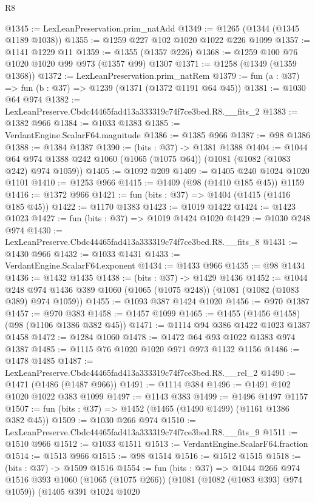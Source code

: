 \begin{lexlean}{R8}
\begin{coremodule}
@1345 := LexLeanPreservation.prim_natAdd
@1349 := @1265 (@1344 (@1345 @1189 @1038))
@1355 := @1259 @227 @102 @1020 @1022 @226 @1099
@1357 := @1141 @1229 @11
@1359 := @1355 (@1357 @226)
@1368 := @1259 @100 @76 @1020 @1020 @99 @973 (@1357 @99) @1307
@1371 := @1258 (@1349 (@1359 @1368))
@1372 := LexLeanPreservation.prim_natRem
@1379 := fun (a : @37) => fun (b : @37) => @1239 (@1371 (@1372 @1191 @64 @45))
@1381 := @1030 @64 @974
@1382 := LexLeanPreserve.Cbdc44465fad413a333319c74f7ce3bed.R8.__fits_2
@1383 := @1382 @966
@1384 := @1033 @1383
@1385 := VerdantEngine.ScalarF64.magnitude
@1386 := @1385 @966
@1387 := @98 @1386
@1388 := @1384 @1387
@1390 := (bits : @37) -> @1381 @1388
@1404 := @1044 @64 @974 @1388 @242 @1060 (@1065 (@1075 @64)) (@1081 (@1082 (@1083 @242) @974 @1059))
@1405 := @1092 @209
@1409 := @1405 @240 @1024 @1020 @1101
@1410 := @1253 @966
@1415 := @1409 (@98 (@1410 @185 @45)) @1159
@1416 := @1372 @966
@1421 := fun (bits : @37) => @1404 (@1415 (@1416 @185 @45))
@1422 := @1170 @1383
@1423 := @1019 @1422
@1424 := @1423 @1023
@1427 := fun (bits : @37) => @1019 @1424 @1020
@1429 := @1030 @248 @974
@1430 := LexLeanPreserve.Cbdc44465fad413a333319c74f7ce3bed.R8.__fits_8
@1431 := @1430 @966
@1432 := @1033 @1431
@1433 := VerdantEngine.ScalarF64.exponent
@1434 := @1433 @966
@1435 := @98 @1434
@1436 := @1432 @1435
@1438 := (bits : @37) -> @1429 @1436
@1452 := @1044
    @248
    @974
    @1436
    @389
    @1060
    (@1065 (@1075 @248))
    (@1081 (@1082 (@1083 @389) @974 @1059))
@1455 := @1093 @387 @1424 @1020
@1456 := @970 @1387
@1457 := @970 @383
@1458 := @1457 @1099
@1465 := @1455 (@1456 @1458) (@98 (@1106 @1386 @382 @45))
@1471 := @1114 @94 @386 @1422 @1023 @1387 @1458
@1472 := @1284 @1060
@1478 := @1472 @64 @93 @1022 @1383 @974 @1387
@1485 := @1115 @76 @1020 @1020 @971 @973 @1132 @1156
@1486 := @1478 @1485
@1487 := LexLeanPreserve.Cbdc44465fad413a333319c74f7ce3bed.R8.__rel_2
@1490 := @1471 (@1486 (@1487 @966))
@1491 := @1114 @384
@1496 := @1491 @102 @1020 @1022 @383 @1099
@1497 := @1143 @383
@1499 := @1496 @1497 @1157
@1507 := fun (bits : @37) => @1452 (@1465 (@1490 @1499) (@1161 @1386 @382 @45))
@1509 := @1030 @266 @974
@1510 := LexLeanPreserve.Cbdc44465fad413a333319c74f7ce3bed.R8.__fits_9
@1511 := @1510 @966
@1512 := @1033 @1511
@1513 := VerdantEngine.ScalarF64.fraction
@1514 := @1513 @966
@1515 := @98 @1514
@1516 := @1512 @1515
@1518 := (bits : @37) -> @1509 @1516
@1554 := fun (bits : @37) =>
  @1044
    @266
    @974
    @1516
    @393
    @1060
    (@1065 (@1075 @266))
    (@1081 (@1082 (@1083 @393) @974 @1059))
    (@1405
      @391
      @1024
      @1020

\end{coremodule}
\end{lexlean}
